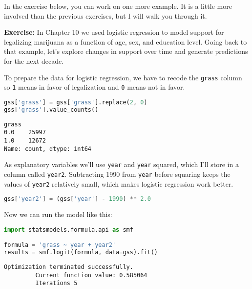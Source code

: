 In the exercise below, you can work on one more example. It is a little
more involved than the previous exercises, but I will walk you through
it.

\pagebreak

\textbf{Exercise:} In Chapter 10 we used logistic regression to model
support for legalizing marijuana as a function of age, sex, and
education level. Going back to that example, let's explore changes in
support over time and generate predictions for the next decade.

To prepare the data for logistic regression, we have to recode the
\passthrough{\lstinline!grass!} column so \passthrough{\lstinline!1!}
means in favor of legalization and \passthrough{\lstinline!0!} means not
in favor.

\begin{lstlisting}[language=Python,style=source]
gss['grass'] = gss['grass'].replace(2, 0)
gss['grass'].value_counts()
\end{lstlisting}

\begin{lstlisting}[style=output]
grass
0.0    25997
1.0    12672
Name: count, dtype: int64
\end{lstlisting}

As explanatory variables we'll use \passthrough{\lstinline!year!} and
\passthrough{\lstinline!year!} squared, which I'll store in a column
called \passthrough{\lstinline!year2!}. Subtracting 1990 from
\passthrough{\lstinline!year!} before squaring keeps the values of
\passthrough{\lstinline!year2!} relatively small, which makes logistic
regression work better.

\begin{lstlisting}[language=Python,style=source]
gss['year2'] = (gss['year'] - 1990) ** 2.0
\end{lstlisting}

Now we can run the model like this:

\begin{lstlisting}[language=Python,style=source]
import statsmodels.formula.api as smf

formula = 'grass ~ year + year2'
results = smf.logit(formula, data=gss).fit()
\end{lstlisting}

\begin{lstlisting}[style=output]
Optimization terminated successfully.
         Current function value: 0.585064
         Iterations 5
\end{lstlisting}

